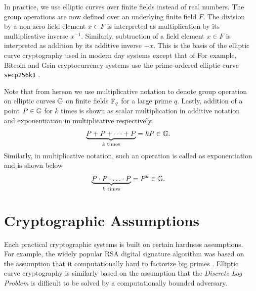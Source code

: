 In practice, we use elliptic curves over finite fields instead of real numbers.
The group operations are now defined over an underlying finite field $F$. 
The division by a non-zero field element $x \in F$ is interpreted as multiplication by its multiplicative inverse $x^{-1}$.
Similarly, subtraction of a field element $x \in F$ is interpreted as addition by its additive inverse $-x$.
This is the basis of the elliptic curve cryptography used in modern day systems except that of 
For example, Bitcoin and Grin cryptocurrency systems use the prime-ordered elliptic curve \texttt{secp256k1} \cite{Hess2000}.

Note that from hereon we use multiplicative notation to denote group operation on elliptic curves $\mathbb{G}$ on finite fields $\mathbb{F}_q$ for a large prime $q$. 
Lastly, addition of a point $P \in \mathbb{G}$ for $k$ times is shown as scalar multiplication in additive notation and exponentiation in multiplicative respectively.
\begin{equation*}
    \underbrace{P + P + \dots + P}_{k \text{ times}} = kP \in \mathbb{G}.
\end{equation*}
Similarly, in multiplicative notation, such an operation is called as exponentiation and is shown below 
\begin{equation*}
    \underbrace{P \cdot P \cdot \ldots \cdot P}_{k \text{ times}} = P^k \in \mathbb{G}.
\end{equation*}

\section{Cryptographic Assumptions}
\label{scn:assumptions}

Each practical cryptographic systems is built on certain hardness assumptions.
For example, the widely popular RSA digital signature algorithm was based on the assumption that it computationally hard to factorize big primes \cite{RSA1978}.  
Elliptic curve cryptography is similarly based on the assumption that the \textit{Discrete Log Problem} is difficult to be solved by a computationally bounded adversary.


